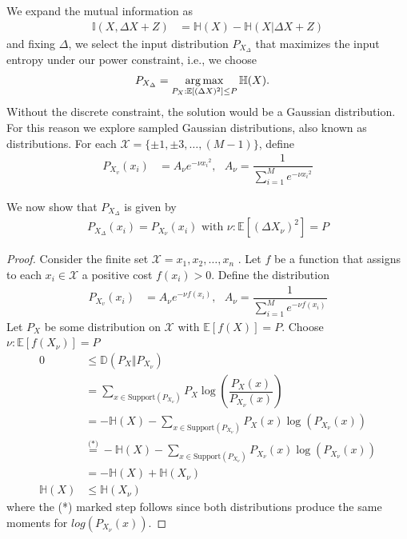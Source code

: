 We expand the mutual information as
\begin{align}
	\mathbb{I}(X,\Delta X+Z) &= \mathbb{H}(X) - \mathbb{H}(X| \Delta X+Z)
\end{align}
and fixing $\Delta$, we select the input distribution $P_{X_\Delta}$ that maximizes the input entropy under our power constraint, i.e., we choose
\begin{align}
	P_{X_\Delta} &= \operatorname*{arg\,max}\limits_{P_X:\mathbb{E}[(\Delta X)^2] \leq P} \mathbb{H}(X).
\end{align}
Without the discrete constraint, the solution would be a Gaussian distribution. For this reason we explore sampled Gaussian distributions, also known as  distributions. For each $\mathcal{X} = \{\pm1, \pm 3,\dots, (M-1)\}$, define
\begin{align}
	P_{X_v}(x_i) &= A_{\nu}e^{-\nu{x_i}^2},\text{  } A_{\nu} = \dfrac{1}{\sum\limits_{i=1}^{M}e^{-\nu{x_i}^2}} 
\end{align}

We now show that $P_{X_\Delta}$ is given by
\begin{align}
P_{X_\Delta}(x_i) = P_{X_\nu}(x_i) \text{ with } \nu : \mathbb{E}[(\Delta X_{\nu})^2] = P
\end{align}

\begin{proof}
Consider the finite set $\mathcal{X} = {x_1, x_2, \dots , x_n}$ . Let $f$ be a function that
assigns to each $x_i \in \mathcal{X}$ a positive cost $f(x_i) > 0$. Define the  distribution
\begin{align}
	P_{X_v}(x_i) &= A_{\nu}e^{-\nu f(x_i)},\text{  } A_{\nu} = \dfrac{1}{\sum\limits_{i=1}^{M}e^{-\nu f(x_i)}} 
\end{align}	
Let $P_X$ be some distribution on $\mathcal{X}$ with $ \mathbb{E}[f(X)] = P $. Choose $\nu : \mathbb{E}[f(X_{\nu})] = P$
\begin{align}
	0 &\leq \mathbb{D}(P_X \Vert P_{X_{\nu}})\\
	&= \sum\limits_{x \in \text{Support}(P_{X_{\nu}})} P_X \log(\dfrac{P_X(x)}{P_{X_{\nu}}(x)}) \\
	&= -\mathbb{H}(X) - \sum\limits_{x \in \text{Support}(P_{X_{\nu}})} P_X(x) \log(P_{X_{\nu}}(x)) \\
	&\overset{\text{(*)}}{=} -\mathbb{H}(X) - \sum\limits_{x \in \text{Support}(P_{X_{\nu}})} P_{X_{\nu}}(x) \log(P_{X_{\nu}}(x)) \\
	&= -\mathbb{H}(X) + \mathbb{H}(X_{\nu}) \\
	\mathbb{H}(X) &\leq \mathbb{H}(X_{\nu})
\end{align}
where the (*) marked step follows since both distributions produce the same moments for $log(P_{X_{\nu}}(x))$.
\end{proof}


